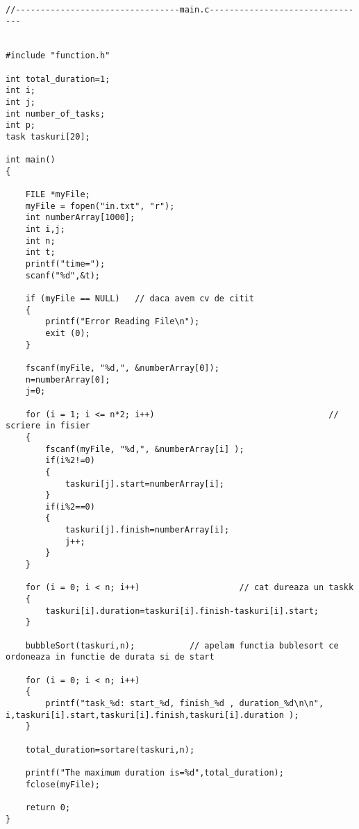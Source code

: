 \documentclass[14pt]{article}
\begin{document}
\\
\begin{lstlisting}
//---------------------------------main.c--------------------------------


#include "function.h"

int total_duration=1;
int i;
int j;
int number_of_tasks;
int p;
task taskuri[20];

int main()
{

    FILE *myFile;
    myFile = fopen("in.txt", "r");
    int numberArray[1000];
    int i,j;
    int n;
    int t;
    printf("time=");
    scanf("%d",&t);

    if (myFile == NULL)   // daca avem cv de citit
    {
        printf("Error Reading File\n");
        exit (0);
    }

    fscanf(myFile, "%d,", &numberArray[0]);
    n=numberArray[0];
    j=0;

    for (i = 1; i <= n*2; i++)                                   // scriere in fisier
    {
        fscanf(myFile, "%d,", &numberArray[i] );
        if(i%2!=0)
        {
            taskuri[j].start=numberArray[i];
        }
        if(i%2==0)
        {
            taskuri[j].finish=numberArray[i];
            j++;
        }
    }

    for (i = 0; i < n; i++)                    // cat dureaza un taskk
    {
        taskuri[i].duration=taskuri[i].finish-taskuri[i].start;
    }

    bubbleSort(taskuri,n);           // apelam functia bublesort ce ordoneaza in functie de durata si de start

    for (i = 0; i < n; i++)
    {
        printf("task_%d: start_%d, finish_%d , duration_%d\n\n", i,taskuri[i].start,taskuri[i].finish,taskuri[i].duration );
    }

    total_duration=sortare(taskuri,n);

    printf("The maximum duration is=%d",total_duration);
    fclose(myFile);

    return 0;
}

\end{lstlisting}

\newpage
\end{document}
